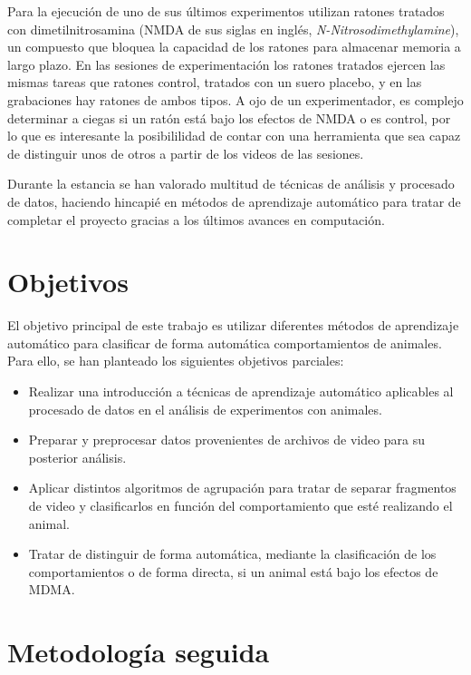 Para la ejecución de uno de sus últimos experimentos utilizan ratones tratados con dimetilnitrosamina (NMDA de sus siglas en inglés, \textit{N-Nitrosodimethylamine}), un compuesto que bloquea la capacidad de los ratones para almacenar memoria a largo plazo. En las sesiones de experimentación los ratones tratados ejercen las mismas tareas que ratones control, tratados con un suero placebo, y en las grabaciones hay ratones de ambos tipos. A ojo de un experimentador, es complejo determinar a ciegas si un ratón está bajo los efectos de NMDA o es control, por lo que es interesante la posibililidad de contar con una herramienta que sea capaz de distinguir unos de otros a partir de los videos de las sesiones.

Durante la estancia se han valorado multitud de técnicas de análisis y procesado de datos, haciendo hincapié en métodos de aprendizaje automático para tratar de completar el proyecto gracias a los últimos avances en computación.

\section{Objetivos} \label{sec:objetivos}
El objetivo principal de este trabajo es utilizar diferentes métodos de aprendizaje automático para clasificar de forma automática comportamientos de animales. Para ello, se han planteado los siguientes objetivos parciales:
\begin{itemize}
    \item Realizar una introducción a técnicas de aprendizaje automático aplicables al procesado de datos en el análisis de experimentos con animales.
    \item Preparar y preprocesar datos provenientes de archivos de video para su posterior análisis.
    \item Aplicar distintos algoritmos de agrupación para tratar de separar fragmentos de video y clasificarlos en función del comportamiento que esté realizando el animal.
    \item Tratar de distinguir de forma automática, mediante la clasificación de los comportamientos o de forma directa, si un animal está bajo los efectos de MDMA.
\end{itemize}


\section{Metodología seguida} \label{sec:metodología}

